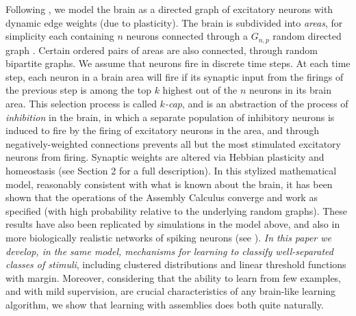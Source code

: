 \documentclass[final,12pt]{colt2022} %
\begin{document}
Following \citet{papadimitriou2020brain}, we model the brain as a directed graph of excitatory neurons with dynamic edge weights (due to plasticity).  The brain is subdivided into {\em areas}, for simplicity each containing $n$ neurons connected through a $G_{n,p}$ random directed graph \citep{erdHos1960evolution}. Certain ordered pairs of areas are also connected, through random bipartite graphs.  We assume that neurons fire in discrete time steps. At each time step, each neuron in a brain area will fire 
if its synaptic input from the firings of the previous step is among the top $k$ highest out of the $n$ neurons in its brain area.  This selection process is called {\em $k$-cap}, and is an abstraction of the process of {\em inhibition} in the brain, in which a separate population of inhibitory neurons is induced to fire by the firing of excitatory neurons in the area, and through negatively-weighted connections prevents all but the most stimulated excitatory neurons from firing. Synaptic weights are altered via Hebbian plasticity and homeostasis (see Section 2 for a full description).  In this stylized mathematical model, reasonably consistent with what is known about the brain, it has been shown that the operations of the Assembly Calculus converge and work as specified (with high probability relative to the underlying random graphs). These results have also been replicated by simulations in the model above, and also in more biologically realistic networks of spiking neurons (see \citet{LMPV,papadimitriou2020brain}). {\em In this paper  we develop, in the same model, mechanisms for learning to classify well-separated classes of stimuli}, including clustered distributions and linear threshold functions with margin. Moreover, considering that the ability to learn from few examples, and with mild supervision, are crucial characteristics of any brain-like learning algorithm, we show that learning with assemblies does both quite naturally.
\end{document}
